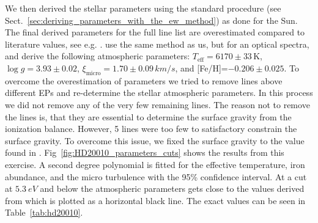\documentclass{aa}
\begin{document}
We then derived the stellar parameters using the standard procedure
(see Sect.~\ref{sec:deriving_parameters_with_the_ew_method}) as
done for the Sun. The final derived parameters for the full line
list are overestimated compared to literature values, see e.g.
\citet{Mortier2013,Gonzalez2010}. \cite{Gonzalez2010} use the same
method as us, but for an optical spectra, and derive the following
atmospheric parameters: $T_\mathrm{eff}=6170\pm33\,\si{\kelvin}$,
$\log g=3.93\pm0.02$, $\xi_\mathrm{micro}=1.70\pm0.09\,\si{km/s}$, and
[Fe/H]=$-0.206\pm0.025$. To overcome the overestimation of parameters
we tried to remove lines above different EPs and re-determine the
stellar atmospheric parameters. In this process we did not remove
any of the very few remaining  lines. The reason not to remove
the  lines is, that they are essential to determine the surface
gravity from the ionization balance. However, 5 lines were too few to
satisfactory constrain the surface gravity. To overcome this issue, we
fixed the surface gravity to the value found in \cite{Gonzalez2010}.
Fig~\ref{fig:HD20010_parameters_cuts} shows the results from this
exercise. A second degree polynomial is fitted for the effective
temperature, iron abundance, and the micro turbulence with the
95\% confidence interval. At a cut at $\SI{5.3}{eV}$ and below
the atmospheric parameters gets close to the values derived from
\cite{Gonzalez2010} which is plotted as a horizontal black line. The
exact values can be seen in Table~\ref{tab:hd20010}.


%
%
\end{document}
